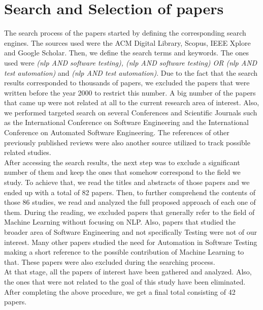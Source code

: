 \section {Search and Selection of papers}
The search process of the papers started by defining the corresponding search engines. The sources used were the ACM Digital Library, Scopus, 
IEEE Xplore and Google Scholar. Then, we define the search terms and keywords. The ones used were \emph{(nlp AND software testing), (nlp 
AND software testing) OR (nlp AND test automation)} and \emph{(nlp AND test automation)}. Due to the fact that the search results corresponded 
to thousands of papers, we excluded the papers that were written before the year 2000 to restrict this number. A big number of the papers that came up 
were not related at all to the current research area of interest. Also, we performed targeted search on several Conferences and Scientific Journals such 
as the International Conference on Software Engineering and the International Conference on Automated Software Engineering. The references of other previously 
published reviews were also another source utilized to track possible related studies. \\

After accessing the search results, the next step was to exclude a significant number of them and keep the ones that somehow correspond to the field we study. 
To achieve that, we read the titles and abstracts of those papers and we ended up with a total of 82 papers. Then, to further comprehend the contents of those 86 studies, 
we read and analyzed the full proposed approach of each one of them. During the reading, we excluded papers that generally refer to the field of 
Machine Learning without focusing on NLP. Also, papers that studied the broader area of Software Engineering and not specifically Testing were not 
of our interest. Many other papers studied the need for Automation in Software Testing making a short reference to the possible contribution of Machine 
Learning to that. These papers were also excluded during the searching process. \\

At that stage, all the papers of interest have been gathered and analyzed. Also, the ones that were not related to the goal of this study have been 
eliminated. After completing the above procedure, we get a final total consisting of 42 papers. 